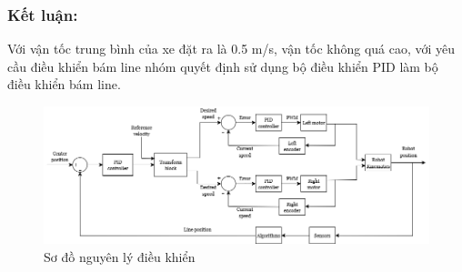                 \subsubsection{Kết luận:} 
                \hspace{0.6cm}Với vận tốc trung bình của xe đặt ra là 0.5 m/s, vận tốc không quá cao, với yêu cầu điều khiển bám line nhóm quyết định sử dụng bộ điều khiển PID làm bộ điều khiển bám line.
                \begin{figure}[H]
                    \centering
                    \includegraphics[width=1\textwidth]{pictures/chapter2/luudodieukhien.png}
                    \caption{Sơ đồ nguyên lý điều khiển}
                    \label{control_principle}
                \end{figure}
                